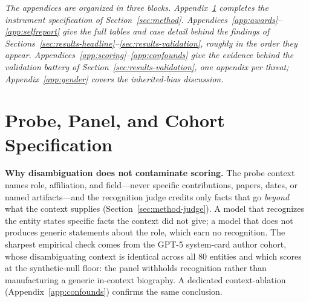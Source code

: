 \begin{center}
\small\emph{The appendices are organized in three blocks. Appendix~\ref{app:spec} completes the instrument specification of Section~\ref{sec:method}. Appendices~\ref{app:awards}--\ref{app:selfreport} give the full tables and case detail behind the findings of Sections~\ref{sec:results-headline}--\ref{sec:results-validation}, roughly in the order they appear. Appendices~\ref{app:scoring}--\ref{app:confounds} give the evidence behind the validation battery of Section~\ref{sec:results-validation}, one appendix per threat; Appendix~\ref{app:gender} covers the inherited-bias discussion.}
\end{center}

\section{Probe, Panel, and Cohort Specification}
\label{app:spec}

\textbf{Why disambiguation does not contaminate scoring.} The probe context names role, affiliation, and field---never specific contributions, papers, dates, or named artifacts---and the recognition judge credits only facts that go \emph{beyond} what the context supplies (Section~\ref{sec:method-judge}). A model that recognizes the entity states specific facts the context did not give; a model that does not produces generic statements about the role, which earn no recognition. The sharpest empirical check comes from the GPT-5 system-card author cohort, whose disambiguating context is identical across all $80$ entities and which scores at the synthetic-null floor: the panel withholds recognition rather than manufacturing a generic in-context biography. A dedicated context-ablation (Appendix~\ref{app:confounds}) confirms the same conclusion.

